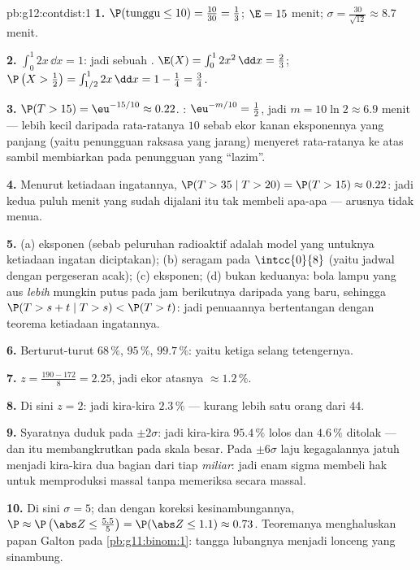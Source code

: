 \begin{solution}{pb:g12:contdist:1}
\textbf{1.} $\P(\text{tunggu} \leq 10) = \frac{10}{30} =
\frac13$; $\E = 15$ menit;
$\sigma = \frac{30}{\sqrt{12}} \approx 8.7$ menit.

\textbf{2.} $\int_0^1 2x\,\dd x = 1$: jadi sebuah .
$\E(X) = \int_0^1 2x^2\,\dd x = \frac23$;
$\P\left(X > \frac12\right) = \int_{1/2}^1 2x\,\dd x =
1 - \frac14 = \frac34$.

\textbf{3.} $\P(T > 15) = \eu^{-15/10} \approx 0.22$. :
$\eu^{-m/10} = \frac12$, jadi $m = 10\ln 2 \approx 6.9$ menit ---
lebih kecil daripada rata-ratanya $10$ sebab ekor kanan eksponennya
yang panjang (yaitu penungguan raksasa yang jarang) menyeret rata-ratanya ke atas sambil membiarkan
 pada penungguan yang ``lazim''.

\textbf{4.} Menurut ketiadaan ingatannya,
$\P(T > 35 \mid T > 20) = \P(T > 15) \approx 0.22$: jadi
kedua puluh menit yang sudah dijalani itu tak membeli apa-apa --- arusnya
tidak menua.

\textbf{5.} (a) eksponen (sebab peluruhan radioaktif adalah model yang
untuknya ketiadaan ingatan diciptakan); (b) seragam pada
$\intcc{0}{8}$ (yaitu jadwal dengan pergeseran acak); (c)
eksponen; (d) bukan keduanya: bola lampu yang aus \emph{lebih} mungkin
putus pada jam berikutnya daripada yang baru, sehingga
$\P(T > s + t \mid T > s) < \P(T > t)$: jadi penuaannya bertentangan dengan
teorema ketiadaan ingatannya.

\textbf{6.} Berturut-turut $68\,\%$, $95\,\%$, $99.7\,\%$: yaitu ketiga
selang tetengernya.

\textbf{7.} $z = \frac{190 - 172}{8} = 2.25$, jadi ekor atasnya
$\approx 1.2\,\%$.

\textbf{8.} Di sini $z = 2$: jadi kira-kira $2.3\,\%$ --- kurang lebih satu orang
dari $44$.

\textbf{9.} Syaratnya duduk pada $\pm 2\sigma$: jadi kira-kira
$95.4\,\%$ lolos dan $4.6\,\%$ ditolak --- dan itu membangkrutkan pada skala besar. Pada
$\pm 6\sigma$ laju kegagalannya jatuh menjadi kira-kira dua bagian dari tiap
\emph{miliar}: jadi enam sigma membeli hak untuk memproduksi massal
tanpa memeriksa secara massal.

\textbf{10.} Di sini $\sigma = 5$; dan dengan koreksi kesinambungannya,
$\P \approx \P\left(\abs Z \leq \frac{5.5}{5}\right) =
\P(\abs Z \leq 1.1) \approx 0.73$. Teoremanya menghaluskan
papan Galton pada \cref{pb:g11:binom:1}: tangga lubangnya
menjadi lonceng yang sinambung.


\end{solution}
